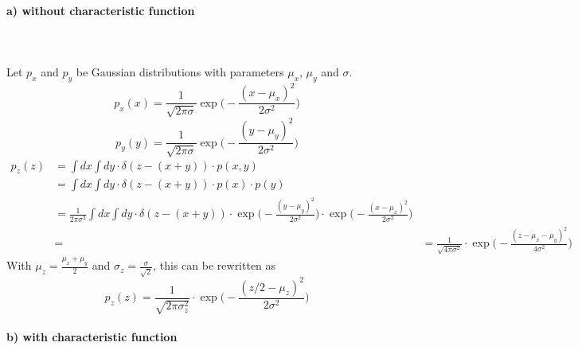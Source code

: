 \paragraph{a) without characteristic function} \ \\ 
\\
Let $p_x$ and $p_y$ be Gaussian distributions with 
parameters $\mu_x$, $\mu_y$ and $\sigma$.
\begin{equation}
    p_x(x)=\frac{1}{\sqrt{2\pi\sigma}}
    \exp\bigg(-\frac{(x-\mu_x)^2}{2\sigma^2}\bigg)
\end{equation}
\begin{equation}
    p_y(y)=\frac{1}{\sqrt{2\pi\sigma}}
    \exp\bigg(-\frac{(y-\mu_y)^2}{2\sigma^2}\bigg)
\end{equation}
\begin{align}
    p_z(z)
    &=\int dx\int dy\cdot\delta(z-(x+y))\cdot p(x,y) \\
    &=\int dx\int dy\cdot\delta(z-(x+y))\cdot p(x)\cdot p(y) \\
    &=\frac{1}{2\pi\sigma^2}\int dx\int dy\cdot
    \delta(z-(x+y))\cdot
    \exp\bigg(-\frac{(y-\mu_y)^2}{2\sigma^2}\bigg)\cdot
    \exp\bigg(-\frac{(x-\mu_x)^2}{2\sigma^2}\bigg) \\
    &=
    &=\frac{1}{\sqrt{4\pi\sigma^2}}\cdot
    \exp\bigg(-\frac{(z-\mu_x-\mu_y)^2}{4\sigma^2}\bigg)
\end{align}
With $\mu_z=\frac{\mu_x+\mu_y}{2}$
and $\sigma_z=\frac{\sigma}{\sqrt{2}}$, this can be 
rewritten as
\begin{equation}
    p_z(z)
    =\frac{1}{\sqrt{2\pi\sigma_z^2}}\cdot
    \exp\bigg(-\frac{(z/2-\mu_z)^2}{2\sigma^2}\bigg)
\end{equation}

\paragraph{b) with characteristic function} \ \\

